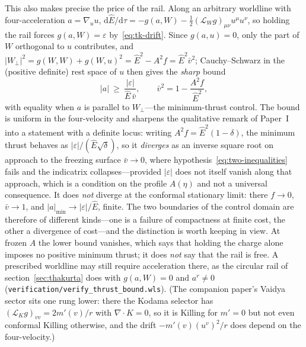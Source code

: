\documentclass[12pt]{iopart}
\theoremstyle{plain}
\theoremstyle{definition}
\theoremstyle{remark}
\newcommand{\Ehat}{\hat E}
\newcommand{\dd}{\mathrm{d}}
\begin{document}
This also makes precise the price of the rail. Along an arbitrary worldline with
four-acceleration $a=\nabla_uu$,
$\dd\Ehat/\dd\tau=-g(a,W)-\tfrac12(\mathcal L_Wg)_{\mu\nu}u^\mu u^\nu$, so
holding the rail forces $g(a,W)=\varepsilon$ by~\eqref{eq:tk-drift}. Since
$g(a,u)=0$, only the part of $W$ orthogonal to $u$ contributes, and
$|W_\perp|^2=g(W,W)+g(W,u)^2=\Ehat^2-A^2f=\Ehat^2\bar v^2$; Cauchy--Schwarz in
the (positive definite) rest space of $u$ then gives the \emph{sharp} bound
\begin{equation}
    |a|\ \ge\ \frac{|\varepsilon|}{\Ehat\,\bar v},
    \qquad \bar v^2=1-\frac{A^2f}{\Ehat^2},
    \label{eq:thrust-bound}
\end{equation}
with equality when $a$ is parallel to $W_\perp$---the minimum-thrust control.
The bound is uniform in the four-velocity and sharpens the qualitative remark of
Paper~I into a statement with a definite locus: writing $A^2f=\Ehat^2(1-\delta)$,
the minimum thrust behaves as $|\varepsilon|/(\Ehat\sqrt\delta)$, so it
\emph{diverges} as an inverse square root on approach to the freezing surface
$\bar v\to0$, where hypothesis~\eqref{eq:two-inequalities} fails and the
indicatrix collapses---provided $|\varepsilon|$ does not itself vanish along that
approach, which is a condition on the profile $A(\eta)$ and not a universal
consequence. It does \emph{not} diverge at the conformal stationary limit: there
$f\to0$, $\bar v\to1$, and $|a|_{\min}\to|\varepsilon|/\Ehat$, finite. The two boundaries of
the control domain are therefore of different kinds---one is a failure of
compactness at finite cost, the other a divergence of cost---and the distinction
is worth keeping in view. At frozen $A$ the lower bound vanishes, which says that
holding the charge alone imposes no positive minimum thrust; it does \emph{not} say
that the rail is free. A prescribed worldline may still require acceleration there,
as the circular rail of section~\ref{sec:thakurta} does with
$g(a,W)=0$ and $a^r\neq0$
(\texttt{verification/verify\_thrust\_bound.wls}). (The companion paper's Vaidya
sector sits one rung lower: there the Kodama selector has
$(\mathcal L_Kg)_{vv}=2m'(v)/r$ with $\nabla\!\cdot\!K=0$, so it is Killing for
$m'=0$ but not even conformal Killing otherwise, and the drift
$-m'(v)(u^v)^2/r$ does depend on the four-velocity.)
\end{document}
